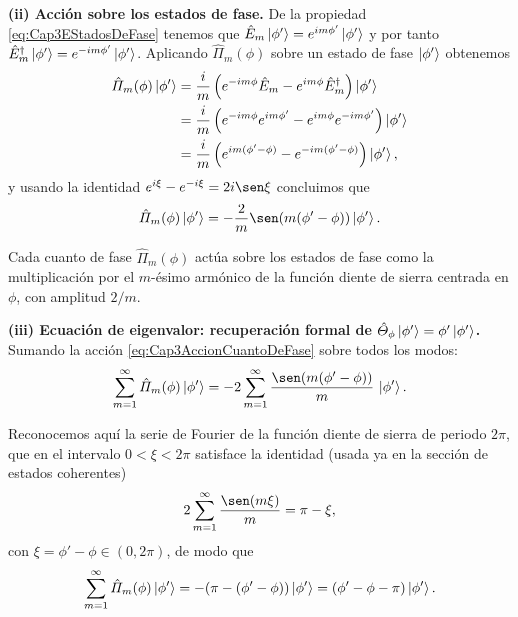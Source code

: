                 \textbf{(ii) Acción sobre los estados de fase.} De la propiedad \ref{eq:Cap3EStadosDeFase} tenemos que $\hat{E}_m\ket{\phi'} = e^{im\phi'}\ket{\phi'}$ y por tanto $\hat{E}_m^\dagger\ket{\phi'} = e^{-im\phi'}\ket{\phi'}$. Aplicando $\hat{\Pi}_m(\phi)$ sobre un estado de fase $\ket{\phi'}$ obtenemos
                \begin{align*}
                    \hat{\Pi}_m(\phi)\ket{\phi'} &= \frac{i}{m}\left(e^{-im\phi}\hat{E}_m - e^{im\phi}\hat{E}_m^\dagger\right)\ket{\phi'}\\
                    &= \frac{i}{m}\left(e^{-im\phi}e^{im\phi'} - e^{im\phi}e^{-im\phi'}\right)\ket{\phi'}\\
                    &= \frac{i}{m}\left(e^{im(\phi'-\phi)} - e^{-im(\phi'-\phi)}\right)\ket{\phi'},
                \end{align*}
                y usando la identidad $e^{i\xi} - e^{-i\xi} = 2i\sen\xi$ concluimos que
                \begin{equation}\label{eq:Cap3AccionCuantoDeFase}
                    \hat{\Pi}_m(\phi)\ket{\phi'} = -\frac{2}{m}\sen\!\left(m(\phi'-\phi)\right)\ket{\phi'}.
                \end{equation}

                Cada cuanto de fase $\hat{\Pi}_m(\phi)$ actúa sobre los estados de fase como la multiplicación por el $m$-ésimo armónico de la función diente de sierra centrada en $\phi$, con amplitud $2/m$.

                \textbf{(iii) Ecuación de eigenvalor: recuperación formal de $\hat{\Theta}_\phi\ket{\phi'} = \phi'\ket{\phi'}$.} Sumando la acción \ref{eq:Cap3AccionCuantoDeFase} sobre todos los modos:
                \begin{equation*}
                    \sum_{m=1}^{\infty}\hat{\Pi}_m(\phi)\ket{\phi'} = -2\sum_{m=1}^{\infty}\frac{\sen\!\left(m(\phi'-\phi)\right)}{m}\,\ket{\phi'}.
                \end{equation*}

                Reconocemos aquí la serie de Fourier de la función diente de sierra de periodo $2\pi$, que en el intervalo $0 < \xi < 2\pi$ satisface la identidad (usada ya en la sección de estados coherentes)
                \begin{equation*}
                    2\sum_{m=1}^{\infty}\frac{\sen(m\xi)}{m} = \pi - \xi,
                \end{equation*}
                con $\xi = \phi'-\phi \in (0,2\pi)$, de modo que
                \begin{equation*}
                    \sum_{m=1}^{\infty}\hat{\Pi}_m(\phi)\ket{\phi'} = -(\pi - (\phi'-\phi))\ket{\phi'} = (\phi' - \phi - \pi)\ket{\phi'}.
                \end{equation*}

